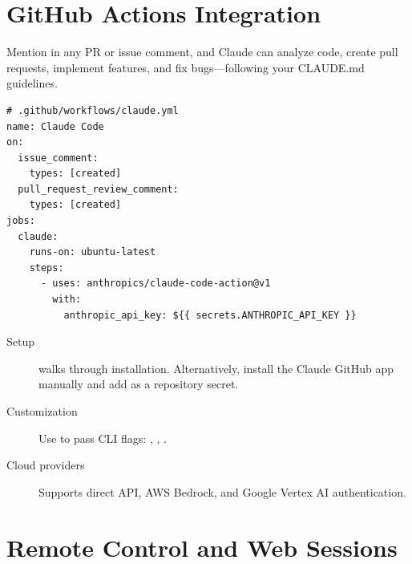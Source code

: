 
\section{GitHub Actions Integration}
\label{sec:github-actions}


Mention  in any PR or issue comment, and Claude can analyze
code, create pull requests, implement features, and fix bugs---following
your CLAUDE.md guidelines.

\begin{verbatim}
# .github/workflows/claude.yml
name: Claude Code
on:
  issue_comment:
    types: [created]
  pull_request_review_comment:
    types: [created]
jobs:
  claude:
    runs-on: ubuntu-latest
    steps:
      - uses: anthropics/claude-code-action@v1
        with:
          anthropic_api_key: ${{ secrets.ANTHROPIC_API_KEY }}
\end{verbatim}

\begin{description}
  \item[Setup]  walks through installation.
    Alternatively, install the Claude GitHub app manually and add
     as a repository secret.
  \item[Customization] Use  to pass CLI flags:
    , , .
  \item[Cloud providers] Supports direct API, AWS Bedrock, and
    Google Vertex AI authentication.
\end{description}

\section{Remote Control and Web Sessions}
\label{sec:remote-control}


